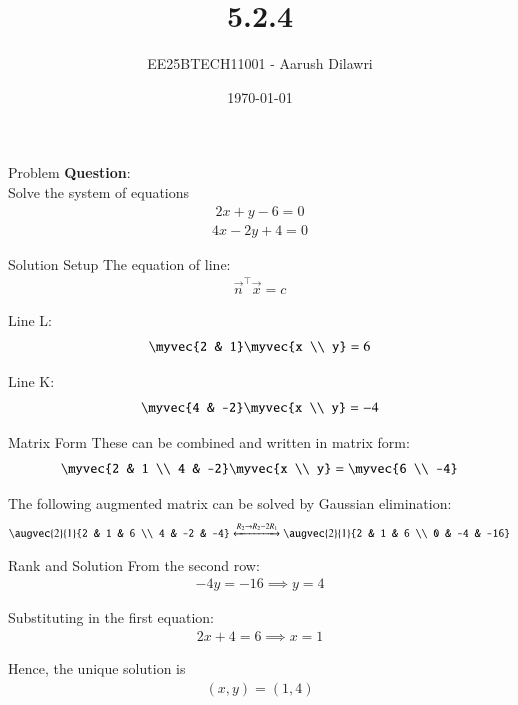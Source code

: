 \documentclass{beamer}
\title{5.2.4}
\date{\today}
\author{EE25BTECH11001 - Aarush Dilawri}
\begin{document}
\frame{\titlepage}

\begin{frame}{Problem}
\textbf{Question}:\\
Solve the system of equations
\begin{align}
2x+y-6=0
\end{align}
\begin{align}
4x-2y+4=0
\end{align}
\end{frame}

\begin{frame}{Solution Setup}
The equation of line:
\begin{align}
\vec{n}^\top\vec{x}=c
\end{align}

Line L:
\begin{align}
\myvec{2 & 1}\myvec{x \\ y}=6
\end{align}

Line K:
\begin{align}
\myvec{4 & -2}\myvec{x \\ y}=-4
\end{align}
\end{frame}

\begin{frame}{Matrix Form}
These can be combined and written in matrix form:
\begin{align}
\myvec{2 & 1 \\ 4 & -2}\myvec{x \\ y} = \myvec{6 \\ -4}
\end{align}

The following augmented matrix can be solved by Gaussian elimination:
\begin{align}
\augvec{2}{1}{2 & 1 & 6 \\ 4 & -2 & -4} \xleftrightarrow{R_2 \rightarrow R_2-2R_1} \augvec{2}{1}{2 & 1 & 6 \\ 0 & -4 & -16}
\end{align}
\end{frame}

\begin{frame}{Rank and Solution}
From the second row:
\begin{align}
-4y=-16 \implies y=4
\end{align}

Substituting in the first equation:
\begin{align}
2x+4=6 \implies x=1
\end{align}

Hence, the unique solution is
\begin{align}
(x,y)=(1,4)
\end{align}
\end{frame}
\end{document}
